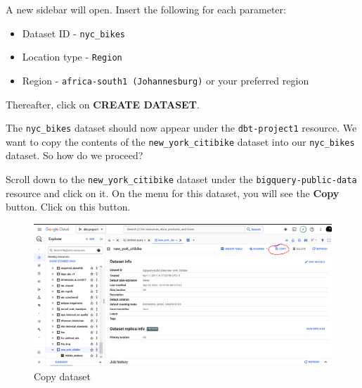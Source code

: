 \documentclass[
]{book}
\begin{document}
A new sidebar will open. Insert the following for each parameter:

\begin{itemize}
\item
  Dataset ID - \texttt{nyc\_bikes}
\item
  Location type - \texttt{Region}
\item
  Region - \texttt{africa-south1\ (Johannesburg)} or your preferred region
\end{itemize}

Thereafter, click on \textbf{CREATE DATASET}.

The \texttt{nyc\_bikes} dataset should now appear under the \texttt{dbt-project1} resource. We want to copy the contents of the \texttt{new\_york\_citibike} dataset into our \texttt{nyc\_bikes} dataset. So how do we proceed?

Scroll down to the \texttt{new\_york\_citibike} dataset under the \texttt{bigquery-public-data} resource and click on it. On the menu for this dataset, you will see the \textbf{Copy} button. Click on this button.

\begin{figure}
\centering
\includegraphics{./images/copy.png}
\caption{Copy dataset}
\end{figure}
\end{document}
